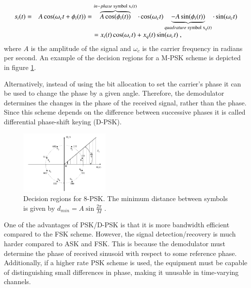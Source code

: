 \documentclass[12pt,a4paper,openright]{report}
\begin{document}
\begin{equation}\label{Eq:PSK symbol}
\begin{array}{*{20}{c}}
{{s_i}(t) = }&{A\cos ({\omega _c}t + {\phi _i}(t)) = \overbrace {A\cos ({\phi _i}(t))}^{in - phase\;{\rm{symbol}}\;{{\rm{x}}_i}(t)} \cdot \cos ({\omega _c}t) \underbrace {-A\sin ({\phi _i}(t))}_{quadrature\;{\rm{symbol}}\;{{\rm{x}}_q}(t)} \cdot \sin ({\omega _c}t)}\\
{}&{ = {x_i}(t)\cos ({\omega _c}t) + {x_q}(t)\sin ({\omega _c}t)} \ ,
\end{array}
\end{equation}
where $A$ is the amplitude of the signal and ${\omega _c}$ is the carrier frequency in radians per second. An example of the decision regions for a M-PSK scheme is depicted in figure \ref{fig:pskdr}.

  
 Alternatively, instead of using the bit allocation to set the carrier's phase it can be used to change the phase by a given angle. Therefore, the demodulator determines the changes in the phase of the received signal, rather than the phase. Since this scheme depends on the difference between successive phases it is called differential phase-shift keying (D-PSK). 

 \begin{figure}[H]
  \centering
    \includegraphics[width=0.4\textwidth]{PSKmodulation.png}
    \caption[Decision regions for 8-PSK]{Decision regions for 8-PSK. The minimum distance between symbols is given by $d_{min}=A\sin\frac{2\pi}{M}$  \cite{XiongDigModTech}.}
    \label{fig:pskdr}
\end{figure}


One of the advantages of PSK/D-PSK is that it is more bandwidth efficient compared to the FSK scheme. However, the signal detection/recovery is much harder compared to ASK and FSK. This is because the demodulator must determine the phase of received sinusoid with respect to some reference phase. Additionally, if a higher rate PSK scheme is used, the equipment must be capable of distinguishing small differences in phase, making it unusable in time-varying channels.
\end{document}
